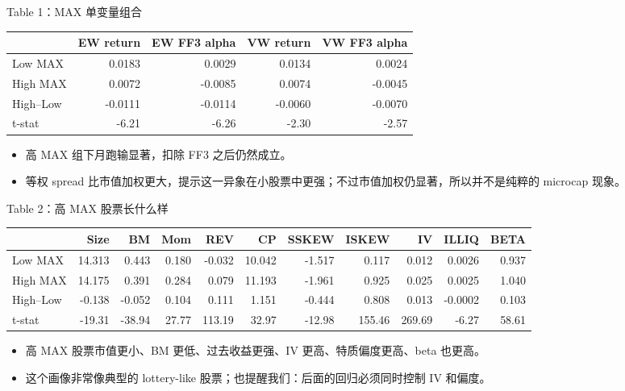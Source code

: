 \documentclass[aspectratio=169,10pt]{beamer}
\newcommand{\tighttable}{\scriptsize\setlength{\tabcolsep}{3pt}\renewcommand{\arraystretch}{1.12}}
\newcommand{\tinytab}{\tiny\setlength{\tabcolsep}{2.2pt}\renewcommand{\arraystretch}{1.08}}
\begin{document}
\begin{frame}{Table 1：MAX 单变量组合}
	\tighttable
	\begin{tabular}{lrrrr}
		\toprule
		& EW return & EW FF3 alpha & VW return & VW FF3 alpha \\
		\midrule
		Low MAX & 0.0183 & 0.0029 & 0.0134 & 0.0024 \\
		High MAX & 0.0072 & -0.0085 & 0.0074 & -0.0045 \\
		High--Low & -0.0111 & -0.0114 & -0.0060 & -0.0070 \\
		t-stat & -6.21 & -6.26 & -2.30 & -2.57 \\
		\bottomrule
	\end{tabular}
	\vspace{6pt}
	\begin{itemize}
		\item 高 MAX 组下月跑输显著，扣除 FF3 之后仍然成立。
		\item 等权 spread 比市值加权更大，提示这一异象在小股票中更强；不过市值加权仍显著，所以并不是纯粹的 microcap 现象。
	\end{itemize}
\end{frame}

\begin{frame}{Table 2：高 MAX 股票长什么样}
	\tinytab
	\begin{tabular}{lrrrrrrrrrr}
		\toprule
		& Size & BM & Mom & REV & CP & SSKEW & ISKEW & IV & ILLIQ & BETA\\
		\midrule
		Low MAX & 14.313 & 0.443 & 0.180 & -0.032 & 10.042 & -1.517 & 0.117 & 0.012 & 0.0026 & 0.937\\
		High MAX & 14.175 & 0.391 & 0.284 & 0.079 & 11.193 & -1.961 & 0.925 & 0.025 & 0.0025 & 1.040\\
		High--Low & -0.138 & -0.052 & 0.104 & 0.111 & 1.151 & -0.444 & 0.808 & 0.013 & -0.0002 & 0.103\\
		t-stat & -19.31 & -38.94 & 27.77 & 113.19 & 32.97 & -12.98 & 155.46 & 269.69 & -6.27 & 58.61\\
		\bottomrule
	\end{tabular}
	\vspace{5pt}
	\begin{itemize}
		\item 高 MAX 股票市值更小、BM 更低、过去收益更强、IV 更高、特质偏度更高、beta 也更高。
		\item 这个画像非常像典型的 lottery-like 股票；也提醒我们：后面的回归必须同时控制 IV 和偏度。
	\end{itemize}
\end{frame}
\end{document}

